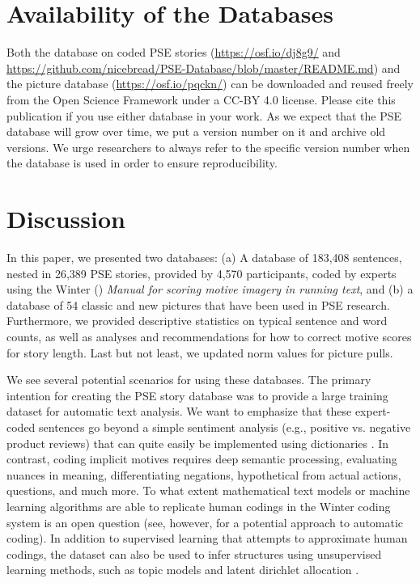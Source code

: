 \documentclass[man,a4paper,mask]{apa6}\usepackage[]{graphicx}\usepackage[]{color}
\begin{document}
\section{Availability of the Databases}

Both the database on coded PSE stories (\url{https://osf.io/dj8g9/} and \url{https://github.com/nicebread/PSE-Database/blob/master/README.md}) and the picture database (\url{https://osf.io/pqckn/}) can be downloaded and reused freely from the Open Science Framework under a CC-BY 4.0 license. Please cite this publication if you use either database in your work.
As we expect that the PSE database will grow over time, we put a version number on it and archive old versions. We urge researchers to always refer to the specific version number when the database is used in order to ensure reproducibility.

\section{Discussion}

In this paper, we presented two databases: (a) A database of 183,408 sentences, nested in 26,389 PSE stories, provided by 4,570 participants, coded by experts using the Winter (\citeyear{winter_ManualScoringMotive_1994}) \emph{Manual for scoring motive imagery in running text}, and (b) a database of 54 classic and new pictures that have been used in PSE research. Furthermore, we provided descriptive statistics on typical sentence and word counts, as well as analyses and recommendations for how to correct motive scores for story length. Last but not least, we updated norm values for picture pulls.

We see several potential scenarios for using these databases. The primary intention for creating the PSE story database was to provide a large training dataset for automatic text analysis. We want to emphasize that these expert-coded sentences go beyond a simple sentiment analysis (e.g., positive vs. negative product reviews) that can quite easily be implemented using dictionaries \parencite[e.g.,][]{feldman_TechniquesApplicationsSentiment_2013}. In contrast, coding implicit motives requires deep semantic processing, evaluating nuances in meaning, differentiating negations, hypothetical from actual actions, questions, and much more. To what extent mathematical text models or machine learning algorithms are able to replicate human codings in the Winter coding system is an open question (see, however,  for a potential approach to automatic coding). In addition to supervised learning that attempts to approximate human codings, the dataset can also be used to infer structures using unsupervised learning methods, such as topic models and latent dirichlet allocation \parencite{blei_LatentDirichletAllocation_2003}.
\end{document}
